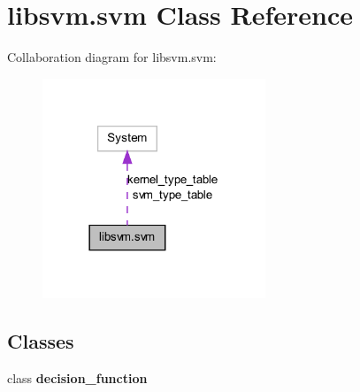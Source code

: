 \hypertarget{classlibsvm_1_1svm}{
\section{libsvm.svm Class Reference}
\label{classlibsvm_1_1svm}
}


Collaboration diagram for libsvm.svm:
\nopagebreak
\begin{figure}[H]
\begin{center}
\leavevmode
\includegraphics[width=189pt]{classlibsvm_1_1svm__coll__graph}
\end{center}
\end{figure}
\subsection*{Classes}
\begin{DoxyCompactItemize}
\item 
class {\bfseries decision\_\-function}
\end{DoxyCompactItemize}
